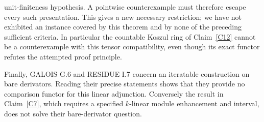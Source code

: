 unit-finiteness hypothesis. A pointwise counterexample must therefore escape every such presentation. This gives a new necessary restriction; we have not exhibited an instance covered by this theorem and by none of the preceding sufficient criteria. In particular the countable Koszul ring of Claim~\ref{C12} cannot be a counterexample with this tensor compatibility, even though its exact functor refutes the attempted proof principle.

Finally, GALOIS G.6 and RESIDUE I.7 concern an iteratable construction on bare derivators. Reading their precise statements shows that they provide no comparison functor for this linear adjunction. Conversely the result in Claim~\ref{C7}, which requires a specified $k$-linear module enhancement and interval, does not solve their bare-derivator question.
